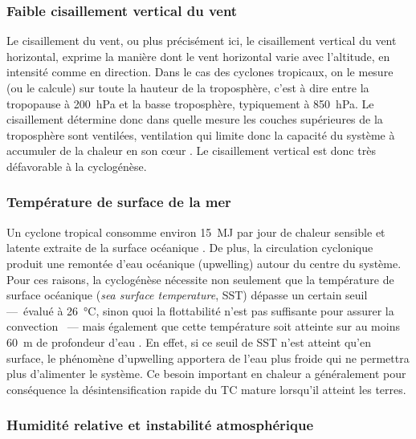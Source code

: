 \documentclass[../main.tex]{subfiles}
\begin{document}
\subsubsection{Faible cisaillement vertical du vent}

Le cisaillement du vent, ou plus précisément ici, le cisaillement vertical du vent horizontal, exprime la manière dont le vent horizontal varie avec l'altitude, en intensité comme en direction. Dans le cas des cyclones tropicaux, on le mesure (ou le calcule) sur toute la hauteur de la troposphère, c'est à dire entre la tropopause à \SI{200}{\hecto\pascal} et la basse troposphère, typiquement à \SI{850}{\hecto\pascal}. Le cisaillement détermine donc dans quelle mesure les couches supérieures de la troposphère sont ventilées, ventilation qui limite donc la capacité du système à accumuler de la chaleur en son cœur \parencite{gray_tropical_1975}. Le cisaillement vertical est donc très défavorable à la cyclogénèse.

\subsubsection{Température de surface de la mer}

Un cyclone tropical consomme environ \SI{15}{\mega\joule} par jour de chaleur sensible et latente extraite de la surface océanique \parencite{gray_tropical_1975}. De plus, la circulation cyclonique produit une remontée d'eau océanique (upwelling) autour du centre du système. Pour ces raisons, la cyclogénèse nécessite non seulement que la température de surface océanique (\textit{sea surface temperature}, SST) dépasse un certain seuil ---~évalué à \SI{26}{\degreeCelsius}, sinon quoi la
flottabilité n'est pas suffisante pour assurer la convection \parencite{palmen_formation_1948}~--- mais également que cette température soit atteinte sur au moins \SI{60}{\metre} de profondeur d'eau \parencite{leipper_observed_1967,perlboth_hurricane_1967}. En effet, si ce seuil de SST n'est atteint qu'en surface, le phénomène d'upwelling apportera de l'eau plus froide qui ne permettra plus d'alimenter le système. Ce besoin important en chaleur a généralement pour conséquence la désintensification rapide du TC mature lorsqu'il atteint les terres.

\subsubsection{Humidité relative et instabilité atmosphérique}
\end{document}
